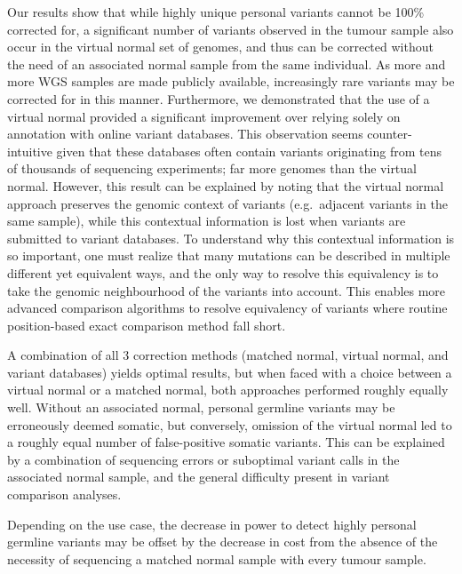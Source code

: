 Our results show that while highly unique personal variants cannot be 100\% corrected for, a significant number of variants observed in the tumour sample also occur in the virtual normal set of genomes, and thus can be corrected without the need of an associated normal sample from the same individual. As more and more WGS samples are made publicly available, increasingly rare variants may be corrected for in this manner. Furthermore, we demonstrated that the use of a virtual normal provided a significant improvement over relying solely on annotation with online variant databases. This observation seems counter-intuitive given that these databases often contain variants originating from tens of thousands of sequencing experiments; far more genomes than the virtual normal. However, this result can be explained by noting that the virtual normal approach preserves the genomic context of variants (e.g.\ adjacent variants in the same sample), while this contextual information is lost when variants are submitted to variant databases. To understand why this contextual information is so important, one must realize that many mutations can be described in multiple different yet equivalent ways, and the only way to resolve this equivalency is to take the genomic neighbourhood of the variants into account. This enables more advanced comparison algorithms to resolve equivalency of variants where routine position-based exact comparison method fall short.

A combination of all 3 correction methods (matched normal, virtual normal, and variant databases) yields optimal results, but when faced with a choice between a virtual normal or a matched normal, both approaches performed roughly equally well. Without an associated normal, personal germline variants may be erroneously deemed somatic, but conversely, omission of the virtual normal led to a roughly equal number of false-positive somatic variants. This can be explained by a combination of sequencing errors or suboptimal variant calls in the associated normal sample, and the general difficulty present in variant comparison analyses.

Depending on the use case, the decrease in power to detect highly personal germline variants may be offset by the decrease in cost from the absence of the necessity of sequencing a matched normal sample with every tumour sample.


